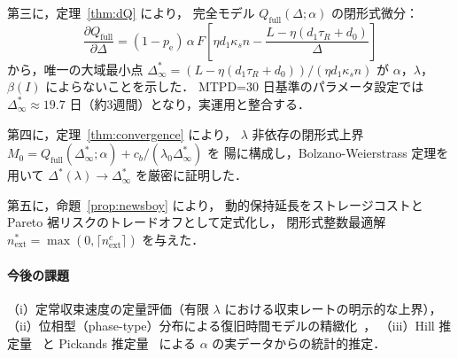 \documentclass[12pt,a4paper]{article}
\theoremstyle{plain}
\theoremstyle{definition}
\theoremstyle{remark}
\newcommand{\pe}{p_{\mathrm{e}}}
\newcommand{\Qf}{Q_{\mathrm{full}}}
\newcommand{\betaI}{\beta(I)}
\newcommand{\Dopt}{\Delta^{*}}
\newcommand{\Dinf}{\Delta^{*}_{\infty}}
\begin{document}
第三に，定理~\ref{thm:dQ} により，
完全モデル $\Qf(\Delta;\alpha)$ の閉形式微分：
\[
\frac{\partial\Qf}{\partial\Delta}
=(1-\pe)\,\alpha\,F\!\left[\eta d_1\kappa_s n-\frac{L-\eta(d_1\tau_R+d_0)}{\Delta}\right]
\]
から，唯一の大域最小点 $\Dinf=(L-\eta(d_1\tau_R+d_0))/(\eta d_1\kappa_s n)$ が
$\alpha$，$\lambda$，$\betaI$ によらないことを示した．
MTPD=30 日基準のパラメータ設定では $\Dinf\approx19.7$ 日（約3週間）となり，実運用と整合する．

第四に，定理~\ref{thm:convergence} により，
$\lambda$ 非依存の閉形式上界 $M_0=\Qf(\Dinf;\alpha)+c_b/(\lambda_0\Dinf)$ を
陽に構成し，Bolzano-Weierstrass 定理を用いて $\Dopt(\lambda)\to\Dinf$ を厳密に証明した．

第五に，命題~\ref{prop:newsboy} により，
動的保持延長をストレージコストと Pareto 裾リスクのトレードオフとして定式化し，
閉形式整数最適解 $n_{\mathrm{ext}}^*=\max(0,\lceil n_{\mathrm{ext}}^c\rceil)$ を与えた．

\paragraph{今後の課題}
（i）定常収束速度の定量評価（有限 $\lambda$ における収束レートの明示的な上界），
（ii）位相型（phase-type）分布による復旧時間モデルの精緻化~\cite{asmussen2003}，
（iii）Hill 推定量~\cite{hill1975} と Pickands 推定量~\cite{pickands1975} による
$\alpha$ の実データからの統計的推定．

\end{document}

